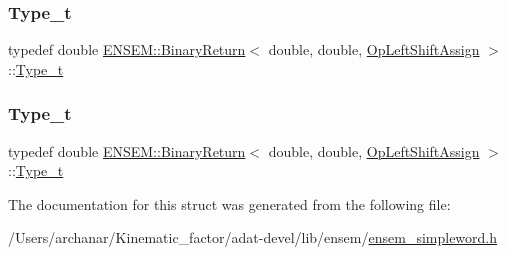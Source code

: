 \mbox{\label{structENSEM_1_1BinaryReturn_3_01double_00_01double_00_01OpLeftShiftAssign_01_4_afd8f7fe1e9c353d307a21e9b6f2e7970}} 
\subsubsection{\texorpdfstring{Type\_t}{Type\_t}\hspace{0.1cm}{\footnotesize\ttfamily [2/3]}}
{\footnotesize\ttfamily typedef double \mbox{\hyperlink{structENSEM_1_1BinaryReturn}{E\+N\+S\+E\+M\+::\+Binary\+Return}}$<$ double, double, \mbox{\hyperlink{structENSEM_1_1OpLeftShiftAssign}{Op\+Left\+Shift\+Assign}} $>$\+::\mbox{\hyperlink{structENSEM_1_1BinaryReturn_3_01double_00_01double_00_01OpLeftShiftAssign_01_4_afd8f7fe1e9c353d307a21e9b6f2e7970}{Type\+\_\+t}}}

\mbox{\label{structENSEM_1_1BinaryReturn_3_01double_00_01double_00_01OpLeftShiftAssign_01_4_afd8f7fe1e9c353d307a21e9b6f2e7970}} 
\subsubsection{\texorpdfstring{Type\_t}{Type\_t}\hspace{0.1cm}{\footnotesize\ttfamily [3/3]}}
{\footnotesize\ttfamily typedef double \mbox{\hyperlink{structENSEM_1_1BinaryReturn}{E\+N\+S\+E\+M\+::\+Binary\+Return}}$<$ double, double, \mbox{\hyperlink{structENSEM_1_1OpLeftShiftAssign}{Op\+Left\+Shift\+Assign}} $>$\+::\mbox{\hyperlink{structENSEM_1_1BinaryReturn_3_01double_00_01double_00_01OpLeftShiftAssign_01_4_afd8f7fe1e9c353d307a21e9b6f2e7970}{Type\+\_\+t}}}



The documentation for this struct was generated from the following file\+:\begin{DoxyCompactItemize}
\item 
/\+Users/archanar/\+Kinematic\+\_\+factor/adat-\/devel/lib/ensem/\mbox{\hyperlink{adat-devel_2lib_2ensem_2ensem__simpleword_8h}{ensem\+\_\+simpleword.\+h}}\end{DoxyCompactItemize}
